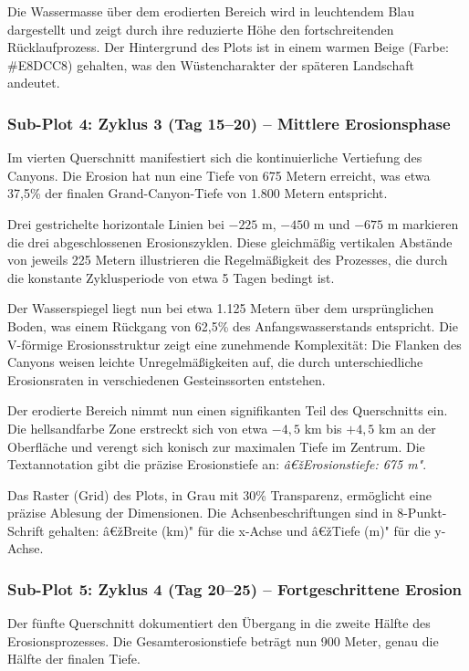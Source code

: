 Die Wassermasse über dem erodierten Bereich wird in leuchtendem Blau dargestellt und zeigt durch ihre reduzierte Höhe den fortschreitenden Rücklaufprozess. Der Hintergrund des Plots ist in einem warmen Beige (Farbe: \#E8DCC8) gehalten, was den Wüstencharakter der späteren Landschaft andeutet.

\subsubsection*{Sub-Plot 4: Zyklus 3 (Tag 15--20) -- Mittlere Erosionsphase}

Im vierten Querschnitt manifestiert sich die kontinuierliche Vertiefung des Canyons. Die Erosion hat nun eine Tiefe von 675 Metern erreicht, was etwa 37,5\% der finalen Grand-Canyon-Tiefe von 1.800 Metern entspricht.

Drei gestrichelte horizontale Linien bei $-225$ m, $-450$ m und $-675$ m markieren die drei abgeschlossenen Erosionszyklen. Diese gleichmäßig vertikalen Abstände von jeweils 225 Metern illustrieren die Regelmäßigkeit des Prozesses, die durch die konstante Zyklusperiode von etwa 5 Tagen bedingt ist.

Der Wasserspiegel liegt nun bei etwa 1.125 Metern über dem ursprünglichen Boden, was einem Rückgang von 62,5\% des Anfangswasserstands entspricht. Die V-förmige Erosionsstruktur zeigt eine zunehmende Komplexität: Die Flanken des Canyons weisen leichte Unregelmäßigkeiten auf, die durch unterschiedliche Erosionsraten in verschiedenen Gesteinssorten entstehen.

Der erodierte Bereich nimmt nun einen signifikanten Teil des Querschnitts ein. Die hellsandfarbe Zone erstreckt sich von etwa $-4,5$ km bis $+4,5$ km an der Oberfläche und verengt sich konisch zur maximalen Tiefe im Zentrum. Die Textannotation gibt die präzise Erosionstiefe an: \textit{â€žErosionstiefe: 675 m"}.

Das Raster (Grid) des Plots, in Grau mit 30\% Transparenz, ermöglicht eine präzise Ablesung der Dimensionen. Die Achsenbeschriftungen sind in 8-Punkt-Schrift gehalten: â€žBreite (km)" für die x-Achse und â€žTiefe (m)" für die y-Achse.

\subsubsection*{Sub-Plot 5: Zyklus 4 (Tag 20--25) -- Fortgeschrittene Erosion}

Der fünfte Querschnitt dokumentiert den Übergang in die zweite Hälfte des Erosionsprozesses. Die Gesamterosionstiefe beträgt nun 900 Meter, genau die Hälfte der finalen Tiefe.

